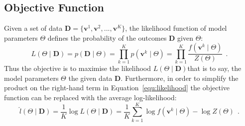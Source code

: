 
\subsection{Objective Function}
Given a set of \DIFdelbegin {}\DIFdelend \DIFaddbegin {}\DIFaddend data $ \mathbf{D}=\{\mathbf{v}^1, \mathbf{v}^2, ..., \mathbf{v}^K\} $, the likelihood function of model parameters $\Theta$ defines the probability of the outcomes $ \mathbf{D}$ given $\Theta$:
\begin{equation}
L (\Theta \mid \mathbf{D}) = p(\mathbf{D} \mid \Theta ) = \prod_{k=1}^K p(\mathbf{v}^k \mid \Theta ) =  \prod_{k=1}^K\dfrac{f(\mathbf{v}^k \mid \Theta )}{Z( \Theta)}~~.
\label{equ:likelihood}
\end{equation}
Thus the objective is to maximise the likelihood $L (\Theta \mid \mathbf{D})$\DIFaddbegin \DIFadd{; }\DIFaddend that is to say, the model parameters $ \Theta $ \DIFdelbegin {}\DIFdelend \DIFaddbegin {}\DIFaddend the given data $\mathbf{D}$.
Furthermore, in order to simplify the product on the right-hand term in Equation~\ref{equ:likelihood} the objective function can be replaced with the average log-likelihood:
\begin{equation}
\label{equ:like}
\hat{l} (\Theta \mid \mathbf{D}) =\frac{1}{K}\log  L (\Theta \mid \mathbf{D}) 
=\frac{1}{K}\sum_{k=1}^K\log f(\mathbf{v}^k \mid \Theta ) - \log Z( \Theta)~~.
\end{equation}

%
%



